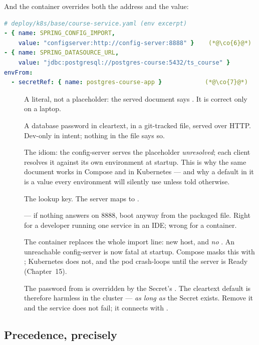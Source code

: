 And the container overrides both the address and the value:

\begin{lstlisting}[language=yaml]
# deploy/k8s/base/course-service.yaml (env excerpt)
- { name: SPRING_CONFIG_IMPORT,
    value: "configserver:http://config-server:8888" }    (*@\co{6}@*)
- { name: SPRING_DATASOURCE_URL,
    value: "jdbc:postgresql://postgres-course:5432/ts_course" }
envFrom:
  - secretRef: { name: postgres-course-app }            (*@\co{7}@*)
\end{lstlisting}

\begin{description}
  \item[] A literal, not a placeholder: the served document says
  . It is correct only on a laptop.
  \item[] A database password in cleartext, in a git-tracked
  file, served over HTTP. Dev-only in intent; nothing in the file says
  so.
  \item[] The  idiom: the config-server
  serves the placeholder \emph{unresolved}; each client resolves it
  against its own environment at startup. This is why the same document
  works in Compose and in Kubernetes --- and why a default in it is a
  value every environment will silently use unless told otherwise.
  \item[] The lookup key. The server maps
   to .
  \item[]  --- if nothing answers on 8888, boot
  anyway from the packaged file. Right for a developer running one
  service in an IDE; wrong for a container.
  \item[] The container replaces the whole import line: new host,
  and \emph{no} . An unreachable config-server is now
  fatal at startup. Compose masks this with
  ; Kubernetes does not,
  and the pod crash-loops until the server is Ready (Chapter~15).
  \item[] The password from  is overridden by the Secret's
  . The cleartext default is
  therefore harmless in the cluster --- \emph{as long as} the Secret
  exists. Remove it and the service does not fail; it connects with
  .
\end{description}

\subsection{Precedence, precisely}

